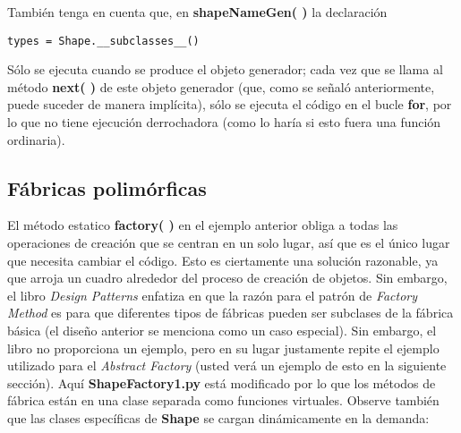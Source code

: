 También tenga en cuenta que, en \textbf{shapeNameGen( )} la declaración   \newline

\begin{lstlisting}
types = Shape.__subclasses__()
\end{lstlisting}

Sólo se ejecuta cuando se produce el objeto generador; cada vez que se llama al método \textbf{next( )} de este objeto generador (que, como se señaló anteriormente, puede suceder de manera implícita), sólo se ejecuta el código en el bucle \textbf{for}, por lo que no tiene ejecución derrochadora (como lo haría si esto fuera una función ordinaria).  \newline

\subsection*{Fábricas polimórficas}
\label{subsec:fp}

El método estatico \textbf{ factory( )} en el ejemplo anterior obliga a todas las operaciones de creación que se centran en un solo lugar, así que es el único lugar que necesita cambiar el código. Esto es ciertamente una solución razonable, ya que arroja un cuadro alrededor del proceso de creación de objetos. Sin embargo, el libro \textit{Design Patterns} enfatiza en que la razón para el patrón de \textit{Factory Method} es para que diferentes tipos de fábricas pueden ser subclases de la fábrica básica (el diseño anterior se menciona como un caso especial). Sin embargo, el libro no proporciona un ejemplo, pero en su lugar justamente repite el ejemplo utilizado para el \textit{Abstract Factory} (usted verá un ejemplo de esto en la siguiente sección). Aquí \textbf{ShapeFactory1.py} está modificado por lo que los métodos de fábrica están en una clase separada como funciones virtuales. Observe también que las clases específicas de \textbf{Shape} se cargan dinámicamente en la demanda:    \newline

